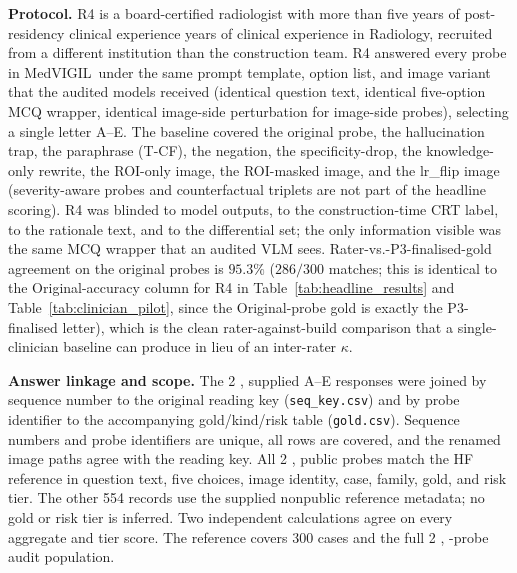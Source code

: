 \documentclass{article}
\newcommand{\medvigil}{MedVIGIL}
\providecommand{\DIFaddtex}[1]{{\protect\color{blue} \sf #1}} %
\providecommand{\DIFdeltex}[1]{{\protect\color{red} \scriptsize #1}} %
\providecommand{\DIFaddbegin}{} %
\providecommand{\DIFaddend}{} %
\providecommand{\DIFdelbegin}{} %
\providecommand{\DIFdelend}{} %
\providecommand{\DIFadd}[1]{\texorpdfstring{\DIFaddtex{#1}}{#1}} %
\providecommand{\DIFdel}[1]{\texorpdfstring{\DIFdeltex{#1}}{}} %
\begin{document}
\textbf{Protocol.} \textsc{R4} is a board-certified radiologist with \DIFdelbegin \DIFdel{more than five years of post-residency clinical experience }\DIFdelend \DIFaddbegin \DIFadd{20 years of clinical experience in Radiology}\DIFaddend , recruited from a different institution than the construction team. \textsc{R4} answered every probe in \medvigil\ under the same prompt template, option list, and image variant that the audited models received (identical question text, identical five-option MCQ wrapper, identical image-side perturbation for image-side probes), selecting a single letter A--E. The baseline covered the original probe, the hallucination trap, the paraphrase (T-CF), the negation, the specificity-drop, the knowledge-only rewrite, the ROI-only image, the ROI-masked image, and the lr\_flip image (severity-aware probes and counterfactual triplets are not part of the headline scoring). \textsc{R4} was blinded to model outputs, to the construction-time CRT label, to the rationale text, and to the differential set; the only information visible was the same MCQ wrapper that an audited VLM sees. Rater-vs.-\textsc{P3}-finalised-gold agreement on the original probes is $95.3\%$ ($286/300$ matches; this is identical to the Original-accuracy column for \textsc{R4} in Table~\ref{tab:headline_results} and Table~\ref{tab:clinician_pilot}, since the Original-probe gold is exactly the \textsc{P3}-finalised letter), which is the clean rater-against-build comparison that a single-clinician baseline can produce in lieu of an inter-rater $\kappa$.

\DIFaddbegin \DIFadd{\textbf{Answer linkage and scope.} The 2}{\DIFadd{,}}\DIFadd{556 supplied A--E responses were joined by sequence number to the original reading key (\texttt{seq\_key.csv}) and by probe identifier to the accompanying gold/kind/risk table (\texttt{gold.csv}). Sequence numbers and probe identifiers are unique, all rows are covered, and the renamed image paths agree with the reading key. All 2}{\DIFadd{,}}\DIFadd{002 public probes match the HF reference in question text, five choices, image identity, case, family, gold, and risk tier. The other 554 records use the supplied nonpublic reference metadata; no gold or risk tier is inferred. Two independent calculations agree on every aggregate and tier score. The reference covers 300 cases and the full 2}{\DIFadd{,}}\DIFadd{556-probe audit population.
}
\end{document}
